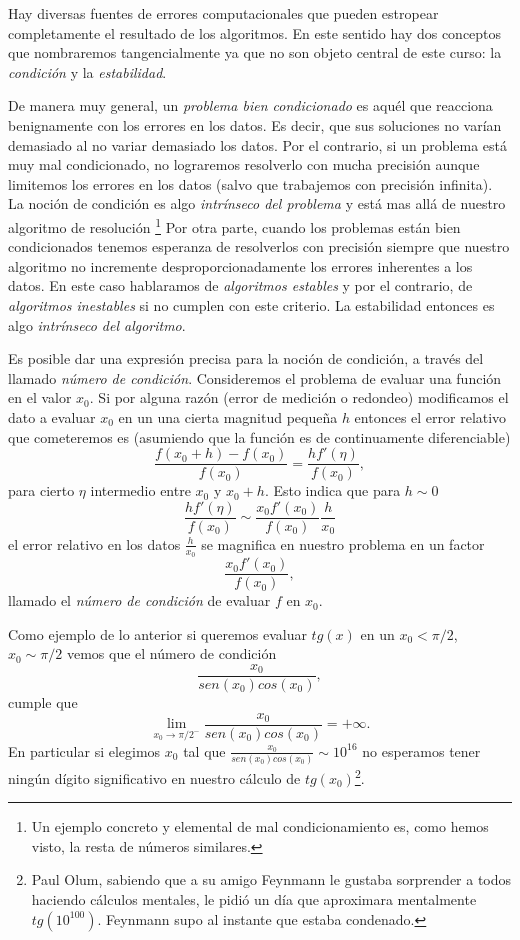 Hay diversas fuentes de errores computacionales que pueden estropear completamente el resultado de los algoritmos. En este sentido hay dos conceptos que nombraremos tangencialmente ya que no son objeto central de este curso: la \emph{condición} y la \emph{estabilidad}.

De manera muy general, un \emph{problema bien condicionado} es aquél que reacciona benignamente con los errores en los datos. Es decir, que sus soluciones no varían demasiado al no variar demasiado los datos. Por el contrario, si un problema está muy mal condicionado, no lograremos resolverlo con mucha precisión aunque limitemos los errores en los datos (salvo que trabajemos con precisión infinita). La noción de condición es algo \emph{intrínseco del problema} y está mas allá de nuestro algoritmo de resolución \footnote{Un ejemplo concreto y elemental de mal condicionamiento es, como hemos visto, la resta de números similares.} Por otra parte, cuando los problemas están bien condicionados tenemos esperanza de resolverlos con precisión siempre que nuestro algoritmo no incremente desproporcionadamente los errores inherentes a los datos. En este caso hablaramos de \emph{algoritmos estables} y por el contrario, de  \emph{algoritmos inestables} si no cumplen con este criterio. La estabilidad entonces es algo \emph{intrínseco del algoritmo}.




\begin{tcolorbox}
Es posible dar una expresión precisa para la noción de condición, a través del llamado
\emph{número de condición}. Consideremos el problema de evaluar una función en el valor $x_0$. Si por alguna razón (error de medición o redondeo) modificamos el dato a evaluar $x_0$ en un una cierta magnitud pequeña $h$ entonces el error relativo que cometeremos es (asumiendo que la función es de continuamente diferenciable)
$$
\frac{f(x_0+h)-f(x_0)}{f(x_0)}=
\frac{hf'(\eta)}{f(x_0)},$$
para cierto $\eta$ intermedio entre $x_0$ y $x_0+h$. Esto indica que para $h\sim 0$
$$
\frac{hf'(\eta)}{f(x_0)}\sim
\frac{x_0f'(x_0)}{f(x_0)}\frac{h}{x_0}
$$
el error relativo en los datos $\frac{h}{x_0}$ se magnifica en nuestro problema en un factor
$$
\frac{x_0f'(x_0)}{f(x_0)},
$$
llamado el \emph{número de condición} de evaluar $f$ en $x_0$.

\end{tcolorbox}
Como ejemplo de lo anterior
si queremos evaluar $tg(x)$ en un $x_0<\pi/2$, $x_0\sim \pi/2$ vemos que el número de condición
$$
\frac{x_0}{sen(x_0)cos(x_0)},
$$
cumple que
$$
\lim_{x_0\to \pi/2^-} \frac{x_0}{sen(x_0)cos(x_0)}=+\infty.
$$
En particular si elegimos  $x_0$ tal que $\frac{x_0}{sen(x_0)cos(x_0)}\sim 10^{16}$ no esperamos tener ningún dígito significativo en nuestro cálculo de $tg(x_0)$\footnote{Paul Olum, sabiendo que a su amigo Feynmann le gustaba sorprender a todos haciendo cálculos mentales, le pidió un día que aproximara mentalmente $tg(10^{100})$. Feynmann supo al instante que estaba condenado.}.


